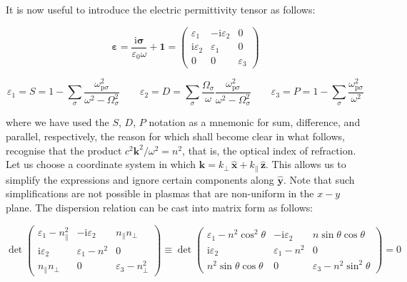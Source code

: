 It is now useful to introduce the electric permittivity tensor as follows:

\begin{equation}
    \boldsymbol{\varepsilon}=\frac{\mathrm{i}\boldsymbol{\sigma}}{\varepsilon_0\omega}+\mathbf{1}=\begin{pmatrix}
        \varepsilon_1 & -\mathrm{i}\varepsilon_2 & 0\\
        \mathrm{i}\varepsilon_2 & \varepsilon_1 & 0\\
        0&0&\varepsilon_3
    \end{pmatrix}
\end{equation}

\begin{equation}
    \varepsilon_1=S=1-\sum_\sigma\frac{\omega_{\mathrm{p}\sigma}^2}{\omega^2-\Omega_\sigma^2}\qquad\varepsilon_2=D=\sum_\sigma\frac{\Omega_\sigma}{\omega}\frac{\omega_{\mathrm{p}\sigma}^2}{\omega^2-\Omega_\sigma^2}\qquad\varepsilon_3=P=1-\sum_\sigma\frac{\omega_{\mathrm{p}\sigma}^2}{\omega^2}
\end{equation}

where we have used the $S$, $D$, $P$ notation as a mnemonic for sum, difference, and parallel, respectively, the reason for which shall become clear in what follows, recognise that the product $c^2\mathbf{k}^2/\omega^2=n^2$, that is, the optical index of refraction. Let us choose a coordinate system in which $\mathbf{k}=k_\perp\,\mathbf{\hat{x}}+k_\parallel\,\mathbf{\hat{z}}$. This allows us to simplify the expressions and ignore certain components along $\mathbf{\hat{y}}$. Note that such simplifications are not possible in plasmas that are non-uniform in the $x-y$ plane. The dispersion relation can be cast into matrix form as follows:

\begin{equation}
    \label{eq-4-41}
    \det{\begin{pmatrix}
        \varepsilon_1-n_\parallel^2 & -\mathrm{i}\varepsilon_2 & n_\parallel n_\perp\\
        \mathrm{i}\varepsilon_2 & \varepsilon_1-n^2 & 0\\
        n_\parallel n_\perp & 0 & \varepsilon_3 - n_\perp^2
    \end{pmatrix}}\equiv\det{\begin{pmatrix}
        \varepsilon_1-n^2\cos^2{\theta} & -\mathrm{i}\varepsilon_2 & n\sin{\theta}\cos{\theta}\\
        \mathrm{i}\varepsilon_2 & \varepsilon_1-n^2 & 0\\
        n^2\sin{\theta}\cos{\theta} & 0 & \varepsilon_3 - n^2\sin^2{\theta}
    \end{pmatrix}}=0
\end{equation}

